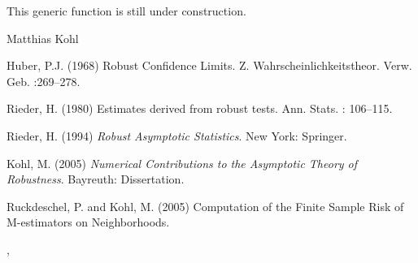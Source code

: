 \begin{Note}\relax
This generic function is still under construction.
\end{Note}
\begin{Author}\relax
Matthias Kohl 
\end{Author}
\begin{References}\relax
Huber, P.J. (1968) Robust Confidence Limits. Z. Wahrscheinlichkeitstheor.
Verw. Geb. :269--278.

Rieder, H. (1980) Estimates derived from robust tests. Ann. Stats. : 106--115.

Rieder, H. (1994) \emph{Robust Asymptotic Statistics}. New York: Springer.

Kohl, M. (2005) \emph{Numerical Contributions to the Asymptotic Theory of Robustness}. 
Bayreuth: Dissertation.

Ruckdeschel, P. and Kohl, M. (2005) Computation of the Finite Sample Risk 
of M-estimators on Neighborhoods.
\end{References}
\begin{SeeAlso}\relax
{}, 
\end{SeeAlso}

